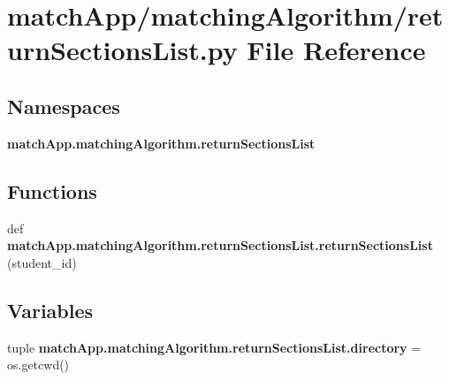 \section{match\+App/matching\+Algorithm/return\+Sections\+List.py File Reference}
\label{return_sections_list_8py}
\subsection*{Namespaces}
\begin{DoxyCompactItemize}
\item 
 {\bf match\+App.\+matching\+Algorithm.\+return\+Sections\+List}
\end{DoxyCompactItemize}
\subsection*{Functions}
\begin{DoxyCompactItemize}
\item 
def {\bf match\+App.\+matching\+Algorithm.\+return\+Sections\+List.\+return\+Sections\+List} (student\+\_\+id)
\end{DoxyCompactItemize}
\subsection*{Variables}
\begin{DoxyCompactItemize}
\item 
tuple {\bf match\+App.\+matching\+Algorithm.\+return\+Sections\+List.\+directory} = os.\+getcwd()
\end{DoxyCompactItemize}
